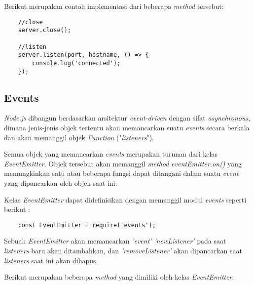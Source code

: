 Berikut merupakan contoh implementasi dari beberapa \textit{method} tersebut: 

\begin{lstlisting}
	//close
	server.close();
	
	//listen
	server.listen(port, hostname, () => {
		console.log('connected');
	});
\end{lstlisting}


\subsection{Events}
\textit{Node.js} dibangun berdasarkan arsitektur \textit{event-driven} dengan sifat \textit{asynchronous}, dimana jenis-jenis objek tertentu akan memancarkan suatu \textit{events} secara berkala dan akan memanggil objek \textit{Function} ("\textit{listeners}").

Semua objek yang memancarkan \textit{events} merupakan turunan dari kelas \textit{EventEmitter}. Objek tersebut akan memanggil \textit{method} \textit{eventEmitter.on()} yang memungkinkan satu atau beberapa fungsi dapat ditangani dalam suatu \textit{event} yang dipancarkan oleh objek saat ini.

Kelas \textit{EventEmitter} dapat didefinisikan dengan memanggil modul \textit{events} seperti berikut :

\begin{lstlisting}
	const EventEmitter = require('events');
\end{lstlisting}

Sebuah \textit{EventEmitter} akan memancarkan \textit{'event'} \textit{'newListener'} pada saat \textit{listeners} baru akan ditambahkan, dan \textit{'removeListener'} akan dipancarkan saat \textit{listeners} saat ini akan dihapus.

Berikut merupakan beberapa \textit{method} yang dimiliki oleh kelas \textit{EventEmitter}:

